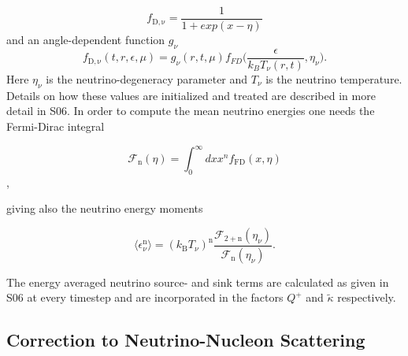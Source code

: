 \documentclass[fleqn,usenatbib]{mnras}
\begin{document}
\begin{appendices}
\begin{equation}
  \label{equ:fermi-dirac}
  f_{\mathrm{D,\nu}} = \frac{1}{1+exp(x-\eta)}
\end{equation}
 and an angle-dependent function $g_{\nu}$
 \begin{equation}
  \label{equ:fermi-dirac-g}
  f_{\mathrm{D,\nu}}(t, r, \epsilon, \mu) = g_{\nu}(r,t,\mu)f_{FD}\Big( \frac{\epsilon}{k_B T_{\nu}(r,t)},\eta_{\nu} \Big).
\end{equation}
 Here $\eta_{\nu}$ is the neutrino-degeneracy parameter and $T_{\nu}$ is the neutrino temperature. Details on how these values are initialized and treated are described in more detail in S06. In order to compute the mean neutrino energies one needs the Fermi-Dirac integral

\begin{equation}
    \label{equ:fermi-dirac-integral}
    \mathcal{F}_{\mathrm{n}}(\eta) = \int_0^{\infty}dx x^n f_{\mathrm{FD}}(x,\eta)
\end{equation},

    giving also the neutrino energy moments

 \begin{equation}
  \label{equ:energy-moments}
  \langle \epsilon^{\mathrm{n}}_{\nu} \rangle = (k_{\mathrm{B}} T_{\nu})^{\mathrm{n}} \frac{\mathcal{F}_{\mathrm{2+n}}(\eta_{\nu})}{\mathcal{F}_{\mathrm{n}}(\eta_{\nu})}.
\end{equation}

 The energy averaged neutrino source- and sink terms are calculated as given in S06 at every timestep and are incorporated in the factors $Q^+$ and $\tilde{\kappa} $ respectively.


  \subsection{Correction to Neutrino-Nucleon Scattering}


\end{appendices}
\end{document}
